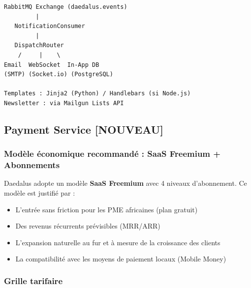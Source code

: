 \documentclass[12pt,a4paper]{article}
\newcommand{\NEW}{\textcolor{daedalusgold}{\textbf{[NOUVEAU]}}}
\begin{document}
\begin{lstlisting}[language={}]
RabbitMQ Exchange (daedalus.events)
         |
   NotificationConsumer
         |
   DispatchRouter
    /     |    \
Email  WebSocket  In-App DB
(SMTP) (Socket.io) (PostgreSQL)

Templates : Jinja2 (Python) / Handlebars (si Node.js)
Newsletter : via Mailgun Lists API
\end{lstlisting}

\subsection{Payment Service \NEW}

\subsubsection{Modèle économique recommandé : SaaS Freemium + Abonnements}

Daedalus adopte un modèle \textbf{SaaS Freemium} avec 4 niveaux d'abonnement. Ce modèle est justifié par :
\begin{itemize}
  \item L'entrée sans friction pour les PME africaines (plan gratuit)
  \item Des revenus récurrents prévisibles (MRR/ARR)
  \item L'expansion naturelle au fur et à mesure de la croissance des clients
  \item La compatibilité avec les moyens de paiement locaux (Mobile Money)
\end{itemize}

\subsubsection{Grille tarifaire}
\end{document}
